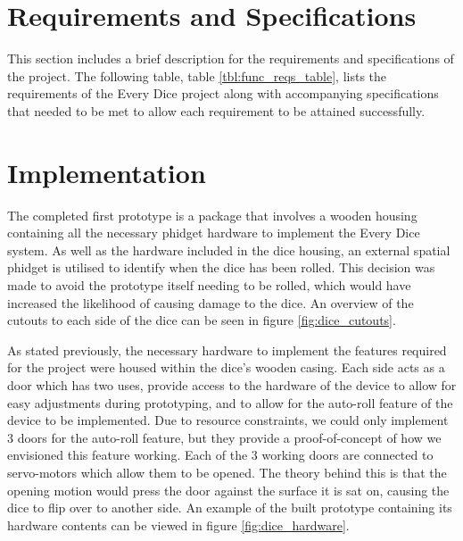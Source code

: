 \documentclass{sigchi}
\begin{document}
\section{Requirements and Specifications}

This section includes a brief description for the requirements and specifications of the project. The following table, table \ref{tbl:func_reqs_table}, lists the requirements of the Every Dice project along with accompanying specifications that needed to be met to allow each requirement to be attained successfully.

\onecolumn
\vspace{2em}




\twocolumn
\section{Implementation}

The completed first prototype is a package that involves a wooden housing containing all the necessary phidget hardware to implement the Every Dice system. As well as the hardware included in the dice housing, an external spatial phidget is utilised to identify when the dice has been rolled. This decision was made to avoid the prototype itself needing to be rolled, which would have increased the likelihood of causing damage to the dice. An overview of the cutouts to each side of the dice can be seen in figure \ref{fig:dice_cutouts}.

  

As stated previously, the necessary hardware to implement the features required for the project were housed within the dice's wooden casing. Each side acts as a door which has two uses, provide access to the hardware of the device to allow for easy adjustments during prototyping, and to allow for the auto-roll feature of the device to be implemented. Due to resource constraints, we could only implement 3 doors for the auto-roll feature, but they provide a proof-of-concept of how we envisioned this feature working. Each of the 3 working doors are connected to servo-motors which allow them to be opened. The theory behind this is that the opening motion would press the door against the surface it is sat on, causing the dice to flip over to another side. An example of the built prototype containing its hardware contents can be viewed in figure \ref{fig:dice_hardware}.

  
\end{document}
